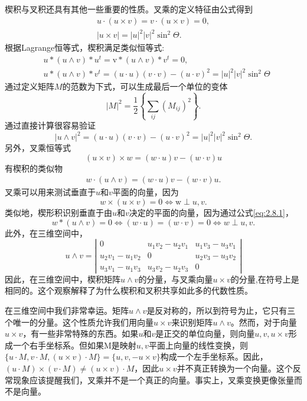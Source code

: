 \begin{CJK}{UTF8}{gbsn}
楔积与叉积还具有其他一些重要的性质。叉乘的定义特征由公式得到
$$
\begin{gathered}
u \cdot(u \times v)=v \cdot(u \times v)=0, \\
|u \times v|=|u|^{2}|v|^{2} \sin ^{2} \Theta .
\end{gathered}
$$
根据Lagrange恒等式，楔积满足类似恒等式:
$$
\begin{aligned}
&u *(u \wedge v) * u^{t}=\mathrm{v} *(u \wedge v) * v^{t}=0, \\
&u *(u \wedge v) * v^{t}=(u \cdot u)(v \cdot v)-(u \cdot v)^{2}=\left|u\right|^{2}\left| v\right|^{2} \sin ^{2} \Theta
\end{aligned}
$$
通过定义矩阵$M$的范数为下式，可以生成最后一个单位的变体
$$
|M|^{2}=\frac{1}{2}\left\lbrace \sum_{i j}\left(M_{i j}\right)^{2} \right\rbrace .
$$
通过直接计算很容易验证
$$
|u \wedge v|^{2}=(u \cdot u)(v \cdot v)-(u \cdot v)^{2}=|u|^{2}|v|^{2} \sin ^{2} \Theta .
$$
另外，叉乘恒等式
$$
(u \times v) \times w=(w \cdot u) v-(w \cdot v) u
$$
有楔积的类似物
\begin{align}
w \cdot(u \wedge v)=(w \cdot u) v-(w \cdot v) u .
\label{eq:2.8.1}
\end{align}
叉乘可以用来测试垂直于$u$和$v$平面的向量，因为
$$
w \times(u \times v)=0 \Leftrightarrow \mathrm{w} \perp u, v .
$$
类似地，楔形积识别垂直于由$u$和$v$决定的平面的向量，因为通过公式\ref{eq:2.8.1}，
$$
w *(u \wedge v)=0 \Leftrightarrow(w \cdot u)=(w \cdot v)=0 \Leftrightarrow w \perp u, v .
$$
此外，在三维空间中，
$$
u \wedge v=\left|\begin{array}{ccc}
0 & u_{1} v_{2}-u_{2} v_{1} & u_{1} v_{3}-u_{3} v_{1} \\
u_{2} v_{1}-u_{1} v_{2} & 0 & u_{2} v_{3}-u_{3} v_{2} \\
u_{3} v_{1}-u_{1} v_{3} & u_{3} v_{2}-u_{2} v_{3} & 0
\end{array}\right|
$$
因此，在三维空间中，楔积矩阵$u \wedge v$的分量，与叉乘向量$u \times v$的分量,在符号上是相同的。这个观察解释了为什么楔积和叉积共享如此多的代数性质。

在三维空间中我们非常幸运。矩阵$u \wedge v$是反对称的，所以到符号为止，它只有三个唯一的分量。这个性质允许我们用向量$u \times v$来识别矩阵$u \wedge v$。然而，对于向量$u \times v$，有一些非常特殊的东西。如果$u$和$v$是正交的单位向量，则向量$u, v, u \times v$形成一个右手坐标系。但如果$\mathrm{M}$是映射$u, v$平面上向量的线性变换，则$\{u \cdot M, v \cdot M,(u \times v) \cdot M\}=\{u, v,-u \times v\}$构成一个左手坐标系。因此，$(u \cdot M) \times (v \cdot M) \neq(u \times v) \cdot M$，因此$u \times v$并不真正转换为一个向量。这个反常现象应该提醒我们，叉乘并不是一个真正的向量。事实上，叉乘变换更像张量而不是向量。



\end{CJK}
